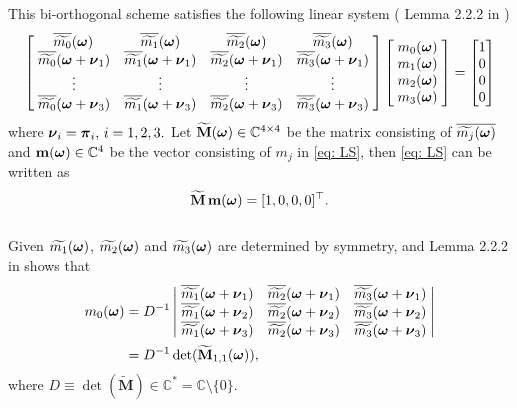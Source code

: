 This bi-orthogonal scheme satisfies the following linear system (
Lemma 2.2.2 in \cite{cohen1993compactly} )
\begin{align}\label{eq: LS}
\begin{bmatrix}
    \, \overline{\widetilde{m_0}}(\boldsymbol{\omega}) &  \overline{\widetilde{m_1}}(\boldsymbol{\omega}) &  \overline{\widetilde{m_2}}(\boldsymbol{\omega}) &  \overline{\widetilde{m_3}}(\boldsymbol{\omega})\; \\
    \;\overline{\widetilde{m_{0}}}(\boldsymbol{\omega} + \boldsymbol{\nu}_{1}) & \overline{\widetilde{m_{1}}}(\boldsymbol{\omega} + \boldsymbol{\nu}_{1})  & \overline{\widetilde{m_{2}}}(\boldsymbol{\omega} + \boldsymbol{\nu}_{1})  & \overline{\widetilde{m_{3}}}(\boldsymbol{\omega} + \boldsymbol{\nu}_{1})\; \\
    \;\vdots & \vdots & \vdots & \vdots \; \\
    \;\overline{\widetilde{m_{0}}}(\boldsymbol{\omega} + \boldsymbol{\nu}_{3}) & \overline{\widetilde{m_{1}}}(\boldsymbol{\omega} + \boldsymbol{\nu}_{3}) & \overline{\widetilde{m_{2}}}(\boldsymbol{\omega} + \boldsymbol{\nu}_{3}) & \overline{\widetilde{m_{3}}}(\boldsymbol{\omega} + \boldsymbol{\nu}_{3})\;
\end{bmatrix}
\begin{bmatrix}
\;m_{0}(\boldsymbol{\omega})\; \\
\;m_{1}(\boldsymbol{\omega})\; \\
\;m_{2}(\boldsymbol{\omega})\; \\
\;m_{3}(\boldsymbol{\omega})\; 
\end{bmatrix} 
=
\begin{bmatrix}
1\\
0\\
0\\
0
\end{bmatrix}
\end{align}
 where $\boldsymbol{\nu}_i = \boldsymbol{\pi}_i,\, i = 1,2,3.$ %
 Let $\widetilde{\mathbf{M}}(\boldsymbol{\omega})\in\mathbb{C}^{4\times 4}$ be the matrix consisting of $\overline{\widetilde{m_{j}}(\boldsymbol{\omega})}$ and $\mathbf{m}(\boldsymbol{\omega})\in\mathbb{C}^4$ be the vector consisting of $m_j$ in \eqref{eq: LS}, then \eqref{eq: LS} can be written as \[\widetilde{\mathbf{M}}\, \mathbf{m} (\boldsymbol{\omega})= [1,0,0,0]^\top.\]\\
Given $\widetilde{m_{1}}(\boldsymbol{\omega})$, $\widetilde{m_{2}}(\boldsymbol{\omega})$ and $\widetilde{m_{3}}(\boldsymbol{\omega})$ are determined by symmetry, and Lemma 2.2.2 in \cite{cohen1993compactly} shows that
\begin{align}\label{eq: m0-sol}
m_0(\V{\omega}) &= D^{-1}%
\left|
\begin{matrix}
    \; \sbarmn{1}{1}  & \sbarmn{2}{1}  & \sbarmn{3}{1}\; \\
    \; \sbarmn{1}{2}  & \sbarmn{2}{2}  & \sbarmn{3}{2}\; \\
    \; \sbarmn{1}{3} & \sbarmn{2}{3} & \sbarmn{3}{3}\;
\end{matrix}
\right| \notag\\
&= D^{-1}\det(\widetilde{\mathbf{M}}_{1,1}(\V{\omega})),
\end{align}
where $ D \equiv \det(\widetilde{\mathbf{M}})\in \mathbb{C}^* = \mathbb{C}\setminus\{0\}$.

